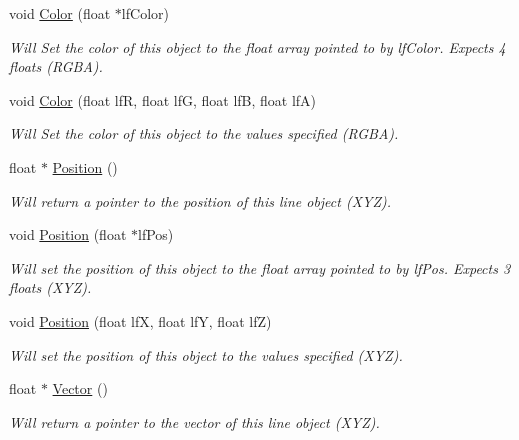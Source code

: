 \begin{DoxyCompactItemize}
void \hyperlink{classc_line_af6f2bacb2fd627d5eff23fd74d2d8686}{Color} (float $\ast$lfColor)
\begin{DoxyCompactList}\small\item\em Will Set the color of this object to the float array pointed to by lfColor. Expects 4 floats (RGBA). \item\end{DoxyCompactList}\item 
void \hyperlink{classc_line_a388632ef2701f10c896212fabeb2373c}{Color} (float lfR, float lfG, float lfB, float lfA)
\begin{DoxyCompactList}\small\item\em Will Set the color of this object to the values specified (RGBA). \item\end{DoxyCompactList}\item 
float $\ast$ \hyperlink{classc_line_abe4306d62f5a0744508cbead16245bf7}{Position} ()
\begin{DoxyCompactList}\small\item\em Will return a pointer to the position of this line object (XYZ). \item\end{DoxyCompactList}\item 
void \hyperlink{classc_line_acfefe5128253475e8291d110f004095b}{Position} (float $\ast$lfPos)
\begin{DoxyCompactList}\small\item\em Will set the position of this object to the float array pointed to by lfPos. Expects 3 floats (XYZ). \item\end{DoxyCompactList}\item 
void \hyperlink{classc_line_a6abc4fedc3f30a6fb45ce4dd83070082}{Position} (float lfX, float lfY, float lfZ)
\begin{DoxyCompactList}\small\item\em Will set the position of this object to the values specified (XYZ). \item\end{DoxyCompactList}\item 
float $\ast$ \hyperlink{classc_line_a661253d6809e688c00b0a8dc5a906af7}{Vector} ()
\begin{DoxyCompactList}\small\item\em Will return a pointer to the vector of this line object (XYZ). \item\end{DoxyCompactList}\item 

\end{DoxyCompactItemize}
